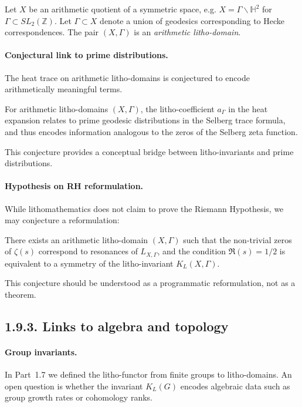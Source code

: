 \begin{definition}
Let $X$ be an arithmetic quotient of a symmetric space,
e.g. $X=\Gamma\backslash \mathbb{H}^2$ for $\Gamma\subset SL_2(\mathbb{Z})$.
Let $\Gamma\subset X$ denote a union of geodesics corresponding
to Hecke correspondences.
The pair $(X,\Gamma)$ is an \emph{arithmetic litho-domain}.
\end{definition}

\paragraph{Conjectural link to prime distributions.}
The heat trace on arithmetic litho-domains is conjectured to encode
arithmetically meaningful terms.

\begin{conjecture}\label{conj:arith}
For arithmetic litho-domains $(X,\Gamma)$,
the litho-coefficient $a_\Gamma$ in the heat expansion
relates to prime geodesic distributions
in the Selberg trace formula,
and thus encodes information analogous to
the zeros of the Selberg zeta function.
\end{conjecture}

This conjecture provides a conceptual bridge between litho-invariants
and prime distributions.

\paragraph{Hypothesis on RH reformulation.}
While lithomathematics does not claim to prove the Riemann Hypothesis,
we may conjecture a reformulation:

\begin{conjecture}\label{conj:RH}
There exists an arithmetic litho-domain $(X,\Gamma)$
such that the non-trivial zeros of $\zeta(s)$
correspond to resonances of $L_{X,\Gamma}$,
and the condition $\Re(s)=1/2$ is equivalent to
a symmetry of the litho-invariant $K_L(X,\Gamma)$.
\end{conjecture}

This conjecture should be understood as a programmatic reformulation,
not as a theorem.

\subsection*{1.9.3. Links to algebra and topology}

\paragraph{Group invariants.}
In Part~1.7 we defined the litho-functor
from finite groups to litho-domains.
An open question is whether the invariant $K_L(G)$
encodes algebraic data such as group growth rates or cohomology ranks.

